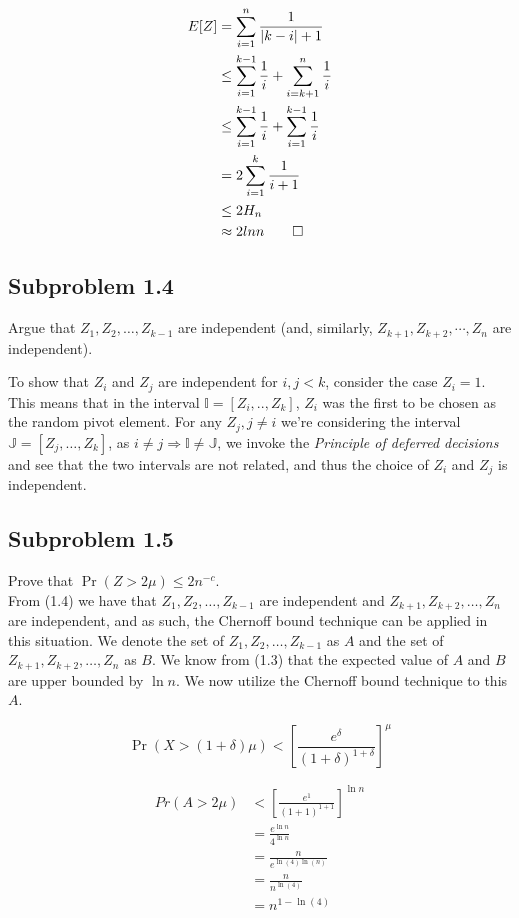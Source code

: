 \documentclass[article,a4paper,oneside]{memoir}
\newcommand{\+}[1]{\ensuremath{\boldsymbol{#1}}}
\begin{document}
\begin{align*}
E[Z] &= \sum_{i=1}^{n} \frac{1}{|k-i|+1}
\\ &\leq \sum_{i=1}^{k-1} \frac{1}{i} + \sum_{i=k+1}^{n} \frac{1}{i}
\\ &\leq \sum_{i=1}^{k-1} \frac{1}{i} + \sum_{i=1}^{k-1} \frac{1}{i}
\\ &= 2\sum_{i=1}^{k} \frac{1}{i+1}
\\ &\leq 2H_n
\\ &\approx 2lnn \qedhere
\end{align*}

\subsection{Subproblem 1.4}
Argue that $Z_1, Z_2, \ldots, Z_{k-1}$ are independent (and, similarly, $Z_{k+1}, Z_{k+2}, \cdots, Z_n$ are independent).
\par
To show that $Z_i$ and $Z_j$ are independent for $i,j < k$, consider the case $Z_i = 1$. This means that in the interval $\mathbb{I} = [Z_i,..,Z_k]$, $Z_i$ was the first to be chosen as the random pivot element.
For any $Z_j, j \neq i$ we're considering the interval $\mathbb{J} = [Z_j,\ldots, Z_k]$, as $i \neq j \Rightarrow \mathbb{I} \neq \mathbb{J}$, we invoke the \emph{Principle of deferred decisions} and see that the two intervals are not related, and thus the choice of $Z_i$ and $Z_j$ is independent.
\subsection{Subproblem 1.5}
Prove that $\Pr (Z > 2\mu)\leq 2n^{-c}$.
\\
From (1.4) we have that $Z_1, Z_2, \ldots, Z_{k-1}$ are independent and $Z_{k+1}, Z_{k+2}, \ldots, Z_n$ are independent, and as such, the Chernoff bound technique can be applied in this situation. We denote the set of $Z_1, Z_2, \ldots, Z_{k-1}$ as $A$ and the set of $Z_{k+1}, Z_{k+2}, \ldots, Z_n$ as $B$. We know from (1.3) that the expected value of $A$ and $B$ are upper bounded by $\ln n$. We now utilize the Chernoff bound technique to this $A$.

$$\Pr \left( X > (1+\delta)\mu \right) < \left[ \frac{e^\delta}{(1+\delta)^{1+\delta}} \right]^\mu$$

\begin{align*}
  Pr( A > 2\mu) & <  \left[ \frac{e^1}{(1+1)^{1+1}} \right] ^{\ln n} \\
  &= \frac{e^{\ln n}}{4^{\ln n}}\\ 
  &= \frac {n}{e^{\ln(4)\ln(n)}} \\
  &= \frac{n}{n^{\ln(4)}}\\
  &= n^{1-\ln (4)}\\
\end{align*}
\end{document}
